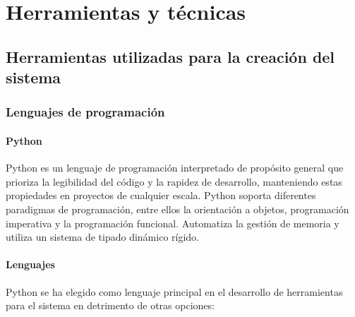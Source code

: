 \chapter{Herramientas y técnicas}

\section{Herramientas utilizadas para la creación del sistema}

\subsection{Lenguajes de programación}

\subsubsection{Python}
Python es un lenguaje de programación interpretado de propósito general que prioriza la legibilidad del código y la rapidez de desarrollo, manteniendo estas propiedades en proyectos de cualquier escala. Python soporta diferentes paradigmas de programación, entre ellos la orientación a objetos, programación imperativa y la programación funcional. Automatiza la gestión de memoria y utiliza un sistema de tipado dinámico rígido.

\subsubsection{Lenguajes}

Python se ha elegido como lenguaje principal en el desarrollo de herramientas para el sistema en detrimento de otras opciones:

